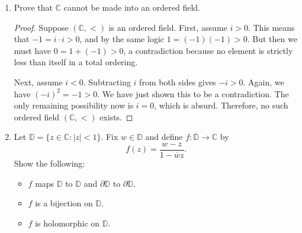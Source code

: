 \documentclass[10pt]{article}
\newcommand{\C}{\mathbb{C}}
\newcommand{\D}{\mathbb{D}}
\renewcommand{\bar}{\overline}
\begin{document}
\begin{enumerate}
\item Prove that $\C$ cannot be made into an ordered field.

\begin{proof}
Suppose $(\C, <)$ is an ordered field.  First, assume $i>0$.  This means that $-1 = i \cdot i > 0$, and by the same logic $1 = (-1)(-1) > 0$.  But then we must have $0 = 1 + (-1) > 0$, a contradiction because no element is strictly less than itself in a total ordering.

Next, assume $i < 0$.  Subtracting $i$ from both sides gives $-i > 0$.  Again, we have $(-i)^2 = -1 > 0$.  We have just shown this to be a contradiction.  The only remaining possibility now is $i = 0$, which is absurd.  Therefore, no such ordered field $(\C, <)$ exists.
\end{proof}

\item Let $\D = \{ z \in \C : |z| < 1 \}$.  Fix $w \in \D$ and define $f:\bar{\D} \rightarrow \C$ by
$$
f(z) = \frac{w-z}{1-\bar{w}z}.
$$
Show the following:
\begin{itemize}
\item $f$ maps $\D$ to $\D$ and $\partial \D$ to $\partial \D$.
\item $f$ is a bijection on $\D$.
\item $f$ is holomorphic on $\D$.
\end{itemize}
\end{enumerate}
\end{document}
